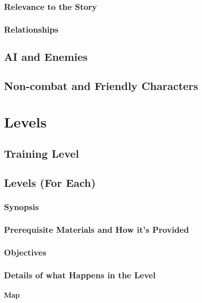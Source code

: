 \documentclass[12pt]{article}
\begin{document}
\subsubsection{Relevance to the Story}

\subsubsection{Relationships}

\subsection{AI and Enemies}

\subsection{Non-combat and Friendly Characters}

\section{Levels}

\subsection{Training Level}

\subsection{Levels (For Each)}

\subsubsection{Synopsis}

\subsubsection{Prerequisite Materials and How it's Provided}

\subsubsection{Objectives}

\subsubsection{Details of what Happens in the Level}

\paragraph{Map}
\end{document}
